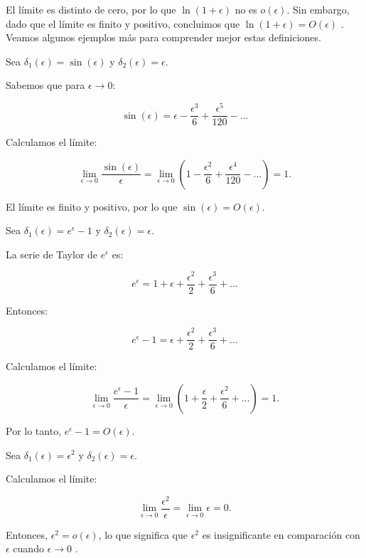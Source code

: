 El límite es distinto de cero, por lo que $\ln\left(1+\epsilon\right)$ no es $o\left(\epsilon\right)$. Sin embargo, dado que el límite es finito y positivo, concluimos que $\ln\left(1+\epsilon\right)=O\left(\epsilon\right)$ \cite{bender2013advanced}.\\

Veamos algunos ejemplos más para comprender mejor estas definiciones.

\begin{example}
    
    Sea \(\delta_1(\epsilon) = \sin(\epsilon)\) y \(\delta_2(\epsilon) = \epsilon\).

    Sabemos que para \(\epsilon \to 0\):
    
    \[
    \sin(\epsilon) = \epsilon - \frac{\epsilon^3}{6} + \frac{\epsilon^5}{120} - \dots
    \]
    
    Calculamos el límite:
    
    \[
    \lim_{\epsilon \to 0} \frac{\sin(\epsilon)}{\epsilon} = \lim_{\epsilon \to 0} \left(1 - \frac{\epsilon^2}{6} + \frac{\epsilon^4}{120} - \dots \right) = 1.
    \]
    
    El límite es finito y positivo, por lo que \(\sin(\epsilon) = O\left( \epsilon \right)\).
    
\end{example}

\begin{example}
    Sea \(\delta_1(\epsilon) = e^\epsilon - 1\) y \(\delta_2(\epsilon) = \epsilon\).

La serie de Taylor de \(e^\epsilon\) es:

\[
e^\epsilon = 1 + \epsilon + \frac{\epsilon^2}{2} + \frac{\epsilon^3}{6} + \dots
\]

Entonces:

\[
e^\epsilon - 1 = \epsilon + \frac{\epsilon^2}{2} + \frac{\epsilon^3}{6} + \dots
\]

Calculamos el límite:

\[
\lim_{\epsilon \to 0} \frac{e^\epsilon - 1}{\epsilon} = \lim_{\epsilon \to 0} \left(1 + \frac{\epsilon}{2} + \frac{\epsilon^2}{6} + \dots \right) = 1.
\]

Por lo tanto, \(e^\epsilon - 1 = O\left( \epsilon \right)\).

\end{example}

\begin{example}
    Sea \(\delta_1(\epsilon) = \epsilon^2\) y \(\delta_2(\epsilon) = \epsilon\).

Calculamos el límite:

\[
\lim_{\epsilon \to 0} \frac{\epsilon^2}{\epsilon} = \lim_{\epsilon \to 0} \epsilon = 0.
\]

Entonces, \(\epsilon^2 = o\left( \epsilon \right)\), lo que significa que \(\epsilon^2\) es insignificante en comparación con \(\epsilon\) cuando \(\epsilon \to 0\) \cite{bender2013advanced}.

\end{example}

